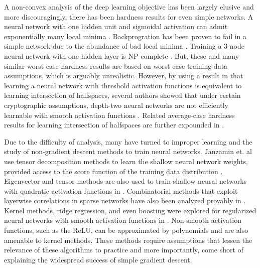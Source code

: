 \documentclass[11pt]{article}
\begin{document}
A non-convex analysis of the deep learning objective has been largely elusive and more discouragingly, there has been hardness results for even simple networks. A neural network with one hidden unit and sigmoidal activation can admit exponentially many local minima \cite{Auer}. Backprogration has been proven to fail in a simple network due to the abundance of bad local minima \cite{brady1989back}. Training a 3-node neural network with one hidden layer is { NP}-complete \cite{BlumR88}.  But, these and many similar worst-case hardness results are based on worst case training data assumptions, which is arguably unrealistic. However, by using a result in \cite{klivans2006cryptographic} that learning a neural network with threshold activation functions is equivalent to learning intersection of halfspaces, several authors showed that under certain cryptographic assumptions, depth-two neural networks are not efficiently learnable with smooth activation functions \cite{LivniSS14} \cite{ZhangLWJ15}\cite{ZhangLJ15}. Related average-case hardness results for learning intersection of halfspaces are further expounded in \cite{daniely2014average}.

Due to the difficulty of analysis, many have turned to improper learning and the study of non-gradient descent methods to train neural networks. Janzamin et. al use tensor decomposition methods to learn the shallow neural network weights, provided access to the score function of the training data distribution \cite{JanzaminSA15}. Eigenvector and tensor methods are also used to train shallow neural networks with quadratic activation functions in \cite{LivniSS14}. Combinatorial methods that exploit layerwise correlations in sparse networks have also been analyzed provably in \cite{AroraBGM13}. Kernel methods, ridge regression, and even boosting were explored for regularized neural networks with smooth activation functions in \cite{shalev2011learning}\cite{ZhangLWJ15}\cite{ZhangLJ15}. Non-smooth activation functions, such as the ReLU, can be approximated by polynomials and are also amenable to kernel methods\cite{GoelKKT16}. These methods require assumptions that lessen the relevance of these algorithms to practice and more importantly, come short of explaining the widespread success of simple gradient descent.
\end{document}
